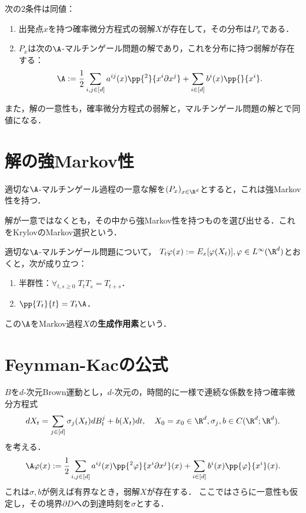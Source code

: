 \documentclass[uplatex,dvipdfmx]{jsreport}
\begin{document}
\begin{theorem}[マルチンゲール問題との等価性]
    次の2条件は同値：
    \begin{enumerate}
        \item 出発点$x$を持つ確率微分方程式の弱解$X$が存在して，その分布は$P_x$である．
        \item $P_x$は次の$\A$-マルチンゲール問題の解であり，これを分布に持つ弱解が存在する：
        \[\A:=\frac{1}{2}\sum_{i,j\in[d]}a^{ij}(x)\pp{^2}{x^i\partial x^j}+\sum_{i\in[d]}b^i(x)\pp{}{x^i}.\]
    \end{enumerate}
    また，解の一意性も，確率微分方程式の弱解と，マルチンゲール問題の解とで同値になる．
\end{theorem}

\section{解の強Markov性}

\begin{theorem}[強Markov性]
    適切な$\A$-マルチンゲール過程の一意な解を$(P_x)_{x\in\R^d}$とすると，これは強Markov性を持つ．
\end{theorem}
\begin{remark}
    解が一意ではなくとも，その中から強Markov性を持つものを選び出せる．これをKrylovのMarkov選択という．
\end{remark}

\begin{proposition}
    適切な$\A$-マルチンゲール問題について，
    $T_t\varphi(x):=E_x[\varphi(X_t)],\varphi\in L^\infty(\R^d)$とおくと，次が成り立つ：
    \begin{enumerate}
        \item 半群性：$\forall_{t,s\ge0}\;T_tT_s=T_{t+s}$．
        \item $\pp{T_t}{t}=T_t\A$．
    \end{enumerate}
    この$\A$をMarkov過程$X$の\textbf{生成作用素}という．
\end{proposition}

\section{Feynman-Kacの公式}

\begin{problem}
    $B$を$d$-次元Brown運動とし，$d$-次元の，時間的に一様で連続な係数を持つ確率微分方程式
    \[dX_t=\sum_{j\in[d]}\sigma_j(X_t)dB_t^j+b(X_t)dt,\quad X_0=x_0\in\R^d,\sigma_j,b\in C(\R^d;\R^d).\]
    を考える．
    \[\A\varphi(x):=\frac{1}{2}\sum_{i,j\in[d]}a^{ij}(x)\pp{^2\varphi}{x^i\partial x^j}(x)+\sum_{i\in[d]}b^i(x)\pp{\varphi}{x^i}(x).\]
    これは$\sigma,b$が例えば有界なとき，弱解$X$が存在する．
    ここではさらに一意性も仮定し，その境界$\partial D$への到達時刻を$\sigma$とする．
\end{problem}
\end{document}
